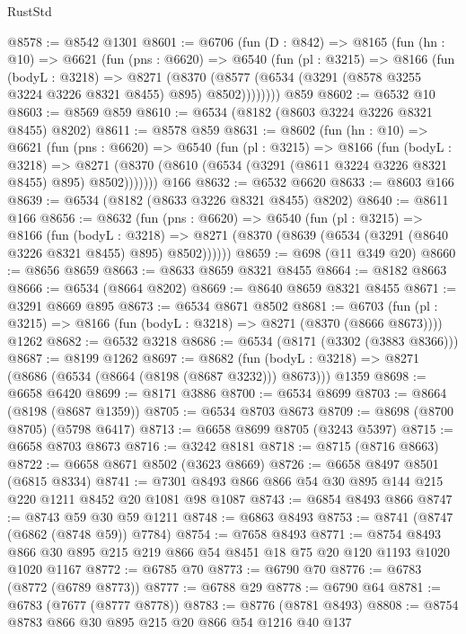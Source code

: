 \begin{lexlean}{RustStd}
\begin{coremodule}
@8578 := @8542 @1301
@8601 := @6706
    (fun (D : @842) =>
    @8165
      (fun (hn : @10) =>
      @6621
        (fun (pns : @6620) =>
        @6540
          (fun (pl : @3215) =>
          @8166
            (fun (bodyL : @3218) =>
            @8271
              (@8370 (@8577 (@6534 (@3291 (@8578 @3255 @3224 @3226 @8321 @8455) @895) @8502))))))))
    @859
@8602 := @6532 @10
@8603 := @8569 @859
@8610 := @6534 (@8182 (@8603 @3224 @3226 @8321 @8455) @8202)
@8611 := @8578 @859
@8631 := @8602
    (fun (hn : @10) =>
    @6621
      (fun (pns : @6620) =>
      @6540
        (fun (pl : @3215) =>
        @8166
          (fun (bodyL : @3218) =>
          @8271 (@8370 (@8610 (@6534 (@3291 (@8611 @3224 @3226 @8321 @8455) @895) @8502)))))))
    @166
@8632 := @6532 @6620
@8633 := @8603 @166
@8639 := @6534 (@8182 (@8633 @3226 @8321 @8455) @8202)
@8640 := @8611 @166
@8656 := @8632
    (fun (pns : @6620) =>
    @6540
      (fun (pl : @3215) =>
      @8166
        (fun (bodyL : @3218) =>
        @8271 (@8370 (@8639 (@6534 (@3291 (@8640 @3226 @8321 @8455) @895) @8502))))))
@8659 := @698 (@11 @349 @20)
@8660 := @8656 @8659
@8663 := @8633 @8659 @8321 @8455
@8664 := @8182 @8663
@8666 := @6534 (@8664 @8202)
@8669 := @8640 @8659 @8321 @8455
@8671 := @3291 @8669 @895
@8673 := @6534 @8671 @8502
@8681 := @6703
    (fun (pl : @3215) => @8166 (fun (bodyL : @3218) => @8271 (@8370 (@8666 @8673))))
    @1262
@8682 := @6532 @3218
@8686 := @6534 (@8171 (@3302 (@3883 @8366)))
@8687 := @8199 @1262
@8697 := @8682
    (fun (bodyL : @3218) => @8271 (@8686 (@6534 (@8664 (@8198 (@8687 @3232))) @8673)))
    @1359
@8698 := @6658 @6420
@8699 := @8171 @3886
@8700 := @6534 @8699
@8703 := @8664 (@8198 (@8687 @1359))
@8705 := @6534 @8703 @8673
@8709 := @8698 (@8700 @8705) (@5798 @6417)
@8713 := @6658 @8699 @8705 (@3243 @5397)
@8715 := @6658 @8703 @8673
@8716 := @3242 @8181
@8718 := @8715 (@8716 @8663)
@8722 := @6658 @8671 @8502 (@3623 @8669)
@8726 := @6658 @8497 @8501 (@6815 @8334)
@8741 := @7301 @8493 @866 @866 @54 @30 @895 @144 @215 @220 @1211 @8452 @20 @1081 @98 @1087
@8743 := @6854 @8493 @866
@8747 := @8743 @59 @30 @59 @1211
@8748 := @6863 @8493
@8753 := @8741 (@8747 (@6862 (@8748 @59)) @7784)
@8754 := @7658 @8493
@8771 := @8754 @8493 @866 @30 @895 @215 @219 @866 @54 @8451 @18 @75 @20 @120 @1193 @1020 @1020 @1167
@8772 := @6785 @70
@8773 := @6790 @70
@8776 := @6783 (@8772 (@6789 @8773))
@8777 := @6788 @29
@8778 := @6790 @64
@8781 := @6783 (@7677 (@8777 @8778))
@8783 := @8776 (@8781 @8493)
@8808 := @8754
    @8783
    @866
    @30
    @895
    @215
    @20
    @866
    @54
    @1216
    @40
    @137

\end{coremodule}
\end{lexlean}
